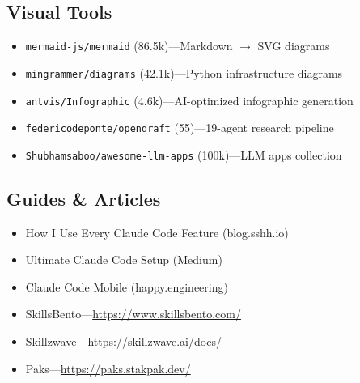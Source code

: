 \documentclass[11pt,a4paper]{article}
\begin{document}
\subsection{Visual Tools}
\begin{itemize}[leftmargin=1em]
  \item \texttt{mermaid-js/mermaid} (86.5k)---Markdown $\rightarrow$ SVG diagrams
  \item \texttt{mingrammer/diagrams} (42.1k)---Python infrastructure diagrams
  \item \texttt{antvis/Infographic} (4.6k)---AI-optimized infographic generation
  \item \texttt{federicodeponte/opendraft} (55)---19-agent research pipeline
  \item \texttt{Shubhamsaboo/awesome-llm-apps} (100k)---LLM apps collection
\end{itemize}

\subsection{Guides \& Articles}
\begin{itemize}[leftmargin=1em]
  \item How I Use Every Claude Code Feature (blog.sshh.io)
  \item Ultimate Claude Code Setup (Medium)
  \item Claude Code Mobile (happy.engineering)
  \item SkillsBento---\url{https://www.skillsbento.com/}
  \item Skillzwave---\url{https://skillzwave.ai/docs/}
  \item Paks---\url{https://paks.stakpak.dev/}
\end{itemize}
\end{document}
